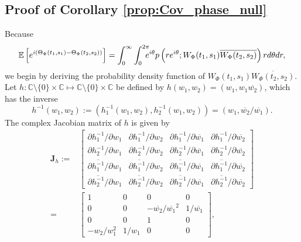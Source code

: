 \documentclass{amsart}
\begin{document}
\subsection{Proof of Corollary \ref{prop:Cov_phase_null}}\label{sec:proof:prop:Cov_phase_null}
Because
\begin{align}\label{start:proof:circov}
\mathbb{E}\left[e^{i(\Theta_{\Phi}(t_{1},s_{1})-\Theta_{\Phi}(t_{2},s_{2}))}\right]
=\int_{0}^{\infty}\int_{0}^{2\pi}\hspace{-0.25cm}e^{i\theta}p\left(re^{i\theta}; W_{\Phi}(t_{1},s_{1})\overline{W_{\Phi}(t_{2},s_{2})}\right)
rd\theta dr,
\end{align}
we begin by deriving the probability density function of
$W_{\Phi}(t_{1},s_{1})\overline{W_{\Phi}(t_{2},s_{2})}$.
Let $h: \mathbb{C}\setminus\{0\}\times \mathbb{C}\mapsto \mathbb{C}\setminus\{0\}\times \mathbb{C}$ be defined by $h(w_{1},w_{2}) = (w_{1},w_{1}\overline{w_{2}})$, which has the inverse
$$h^{-1}(w_{1},w_{2}) :=\left(h^{-1}_{1}(w_{1},w_{2}),h^{-1}_{2}(w_{1},w_{2})\right) =  (w_{1},\overline{w_{2}}/\overline{w_{1}}).$$
The complex Jacobian matrix of $h$ is given by
\begin{align*}
\mathbf{J}_{h}:=&\left[\begin{array}{cccc}
\partial h^{-1}_{1}/\partial w_{1} & \partial h^{-1}_{1}/\partial w_{2} & \partial h^{-1}_{1}/\partial \overline{w_{1}} & \partial h^{-1}_{1}/\partial \overline{w_{2}}
\\
\partial h^{-1}_{2}/\partial w_{1} & \partial h^{-1}_{2}/\partial w_{2} & \partial h^{-1}_{2}/\partial \overline{w_{1}} & \partial h^{-1}_{2}/\partial \overline{w_{2}}
\\
\partial \overline{h^{-1}_{1}}/\partial w_{1} & \partial \overline{h^{-1}_{1}}/\partial w_{2} & \partial \overline{h^{-1}_{1}}/\partial \overline{w_{1}} & \partial \overline{h^{-1}_{1}}/\partial \overline{w_{2}}
\\
\partial \overline{h^{-1}_{2}}/\partial w_{1} & \partial \overline{h^{-1}_{2}}/\partial w_{2} & \partial \overline{h^{-1}_{2}}/\partial \overline{w_{1}} & \partial \overline{h^{-1}_{2}}/\partial \overline{w_{2}}
\end{array}\right]
\\=&\left[\begin{array}{cccc}
1 & 0 & 0 & 0
\\
0 & 0 & -\overline{w_{2}}/\overline{w_{1}}^{2} & 1/\overline{w_{1}}
\\
0 & 0 & 1 & 0
\\
-w_{2}/w_{1}^{2} & 1/w_{1} & 0  & 0
\end{array}\right],
\end{align*}
\end{document}
